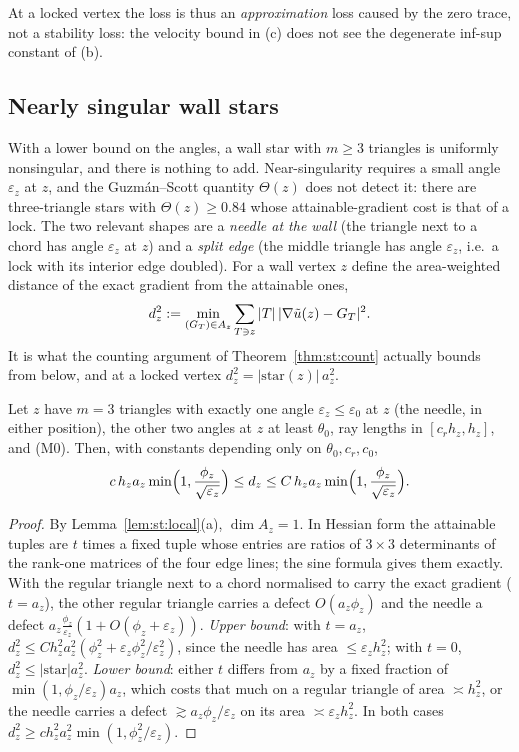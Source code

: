 At a locked vertex the loss is thus an \emph{approximation} loss caused by the zero trace, not a stability loss: the velocity bound in (c) does not see the degenerate inf-sup constant of (b).

\subsection{Nearly singular wall stars}
With a lower bound on the angles, a wall star with $m\ge3$ triangles is uniformly nonsingular, and there is nothing to add. Near-singularity requires a small angle $\varepsilon_z$ at $z$, and the Guzm\'an--Scott quantity $\Theta(z)$ does not detect it: there are three-triangle stars with $\Theta(z)\ge0.84$ whose attainable-gradient cost is that of a lock. The two relevant shapes are a \emph{needle at the wall} (the triangle next to a chord has angle $\varepsilon_z$ at $z$) and a \emph{split edge} (the middle triangle has angle $\varepsilon_z$, i.e.\ a lock with its interior edge doubled). For a wall vertex $z$ define the area-weighted distance of the exact gradient from the attainable ones,
\[
d_z^2:=\min_{(G_T)\in A_z}\sum_{T\ni z}|T|\,|\nabla\tilde u(z)-G_T|^2 .
\]
It is what the counting argument of Theorem~\ref{thm:st:count} actually bounds from below, and at a locked vertex $d_z^2=|\text{star}(z)|\,a_z^2$.

\begin{theorem}\label{thm:st:needle}
Let $z$ have $m=3$ triangles with exactly one angle $\varepsilon_z\le\varepsilon_0$ at $z$ (the needle, in either position), the other two angles at $z$ at least $\theta_0$, ray lengths in $[c_rh_z,h_z]$, and (M0). Then, with constants depending only on $\theta_0,c_r,c_0$,
\[
c\,h_za_z\min\Bigl(1,\frac{\phi_z}{\sqrt{\varepsilon_z}}\Bigr)\le d_z\le C\,h_za_z\min\Bigl(1,\frac{\phi_z}{\sqrt{\varepsilon_z}}\Bigr).
\]
\end{theorem}

\begin{proof}
By Lemma~\ref{lem:st:local}(a), $\dim A_z=1$. In Hessian form the attainable tuples are $t$ times a fixed tuple whose entries are ratios of $3\times3$ determinants of the rank-one matrices of the four edge lines; the sine formula gives them exactly. With the regular triangle next to a chord normalised to carry the exact gradient ($t=a_z$), the other regular triangle carries a defect $O(a_z\phi_z)$ and the needle a defect $a_z\frac{\phi_z}{\varepsilon_z}(1+O(\phi_z+\varepsilon_z))$. \emph{Upper bound}: with $t=a_z$, $d_z^2\le Ch_z^2a_z^2(\phi_z^2+\varepsilon_z\phi_z^2/\varepsilon_z^2)$, since the needle has area $\le\varepsilon_zh_z^2$; with $t=0$, $d_z^2\le|\text{star}|a_z^2$. \emph{Lower bound}: either $t$ differs from $a_z$ by a fixed fraction of $\min(1,\phi_z/\varepsilon_z)a_z$, which costs that much on a regular triangle of area $\asymp h_z^2$, or the needle carries a defect $\gtrsim a_z\phi_z/\varepsilon_z$ on its area $\asymp\varepsilon_zh_z^2$. In both cases $d_z^2\ge ch_z^2a_z^2\min(1,\phi_z^2/\varepsilon_z)$.
\end{proof}

